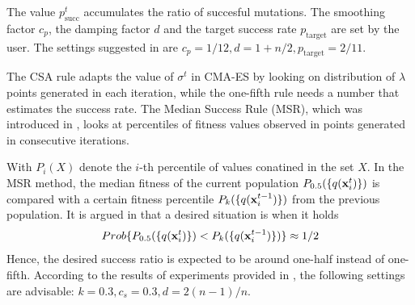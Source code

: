 \documentclass[runningheads,a4paper]{llncs}
\newcommand{\wek}[1]{
    {\bf #1} 
}
\begin{document}

The value $p_\text{succ}^{t}$ accumulates the ratio of succesful mutations. The smoothing factor $c_p$, the damping factor $d$ and the target success rate $p_\text{target}$ are set by the user. The settings suggested in \cite{Suttorp09} are $c_p=1/12, d=1+n/2, p_\text{target}=2/11$. 

The CSA rule adapts the value of $\sigma^t$ in CMA-ES by looking on distribution of $\lambda$ points generated in each iteration, while the one-fifth rule needs a number that estimates the success rate. The Median Success Rule (MSR), which was introduced in \cite{Elhara13}, looks at percentiles of fitness values observed in points generated in consecutive iterations. 




With $P_i(X)$ denote the $i$-th percentile of values conatined in the set $X$. In the MSR method, the median fitness of the current population $P_{0.5}(\{q(\wek{x}^t_i)\})$ is compared with a certain fitness percentile $P_{k}(\{q(\wek{x}^{t-1}_i)\})$ from the previous population. It is argued in \cite{Elhara13} that a desired situation is when it holds
\begin{equation}
Prob\{P_{0.5}(\{q(\wek{x}^t_i)\}) < P_{k}(\{q(\wek{x}^{t-1}_i)\})\} \approx 1/2
\end{equation}       
Hence, the desired success ratio is expected to be around one-half instead of one-fifth. According to the results of experiments provided in \cite{Elhara13}, the following settings are advisable: $k=0.3, c_s=0.3, d=2(n-1)/n$.
\end{document}
